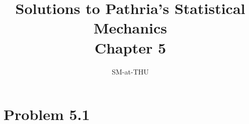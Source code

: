 \documentclass{article}
\author{SM-at-THU}
\title{\bf{Solutions to Pathria's Statistical Mechanics}\\Chapter 5}
\begin{document}
\maketitle
\section*{Problem 5.1}
\end{document}

